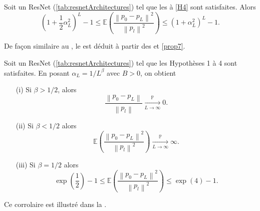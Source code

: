 \begin{proposition}\label{prop7}
    Soit un ResNet (\ref{tab:resnetArchitectures}) tel que les  à \ref{H4} sont satisfaites. Alors 
    \[
        (1 + \frac{1}{2} \alpha _L ^2)^L - 1 \leqslant \mathbb{E}\left( \frac{\left\| p_0 - p_L \right\| ^2 }{\left\| p_l \right\| ^2 } \right) \leqslant (1 + \alpha _L ^2)^L - 1
    .\]
\end{proposition}

De façon similaire au , le  est déduit à partir des  et \ref{prop7}.

\begin{cor}\label{cor8}
    Soit un ResNet (\ref{tab:resnetArchitectures}) tel que les Hypothèses 1 à 4 sont satisfaites. En posant $ \alpha _L = 1 / L^\beta $ avec $ B > 0 $, on obtient 
    \begin{enumerate}
        \item [(i)] Si $ \beta > 1/2 $, alors 
        \[
            \frac{\left\| p_0 - p_L \right\| }{\left\| p_l \right\|  } \xrightarrow[L \to \infty]{\mathbb{P}} 0
        .\]
        \item [(ii)] Si $ \beta < 1/2 $ alors 
        \[
            \mathbb{E}\left(\frac{\left\| p_0 - p_L \right\| ^2 }{\left\| p_l \right\| ^2 }\right) \xrightarrow[L \to \infty]{\mathbb{P}} \infty
        .\]
        \item [(iii)] Si $ \beta = 1/2 $ alors
        \[
            \exp (\frac{1}{2}) - 1 \leqslant \mathbb{E}\left(\frac{\left\| p_0 - p_L \right\| ^2 }{\left\| p_l \right\| ^2 }\right) \leqslant \exp (4) - 1
        .\]
    \end{enumerate}
    Ce corrolaire est illustré dans la .
\end{cor}

